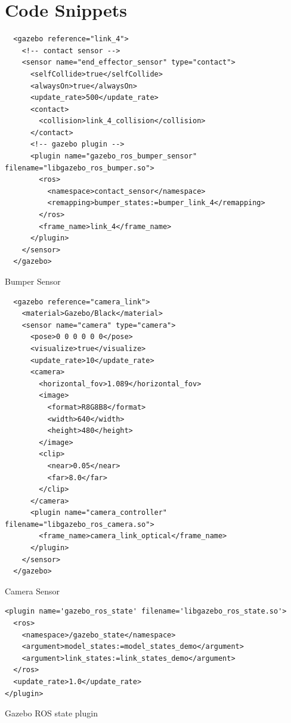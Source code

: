 \documentclass[12pt,oneside]{article}
\begin{document}
\section{Code Snippets}
\begin{listing}[htbp]
\begin{verbatim} 
  <gazebo reference="link_4">
    <!-- contact sensor -->
    <sensor name="end_effector_sensor" type="contact">
      <selfCollide>true</selfCollide>
      <alwaysOn>true</alwaysOn>
      <update_rate>500</update_rate>
      <contact>
        <collision>link_4_collision</collision>
      </contact>
      <!-- gazebo plugin -->
      <plugin name="gazebo_ros_bumper_sensor" filename="libgazebo_ros_bumper.so">
        <ros>
          <namespace>contact_sensor</namespace>
          <remapping>bumper_states:=bumper_link_4</remapping>
        </ros>
        <frame_name>link_4</frame_name>
      </plugin>
    </sensor>
  </gazebo>
\end{verbatim}
\caption{Bumper Sensor}
\label{bumperSensorXml}
\end{listing}

\begin{listing}[htbp]
\begin{verbatim} 
  <gazebo reference="camera_link">
    <material>Gazebo/Black</material>
    <sensor name="camera" type="camera">
      <pose>0 0 0 0 0 0</pose>
      <visualize>true</visualize>
      <update_rate>10</update_rate>
      <camera>
        <horizontal_fov>1.089</horizontal_fov>
        <image>
          <format>R8G8B8</format>
          <width>640</width>
          <height>480</height>
        </image>
        <clip>
          <near>0.05</near>
          <far>8.0</far>
        </clip>
      </camera>
      <plugin name="camera_controller" filename="libgazebo_ros_camera.so">
        <frame_name>camera_link_optical</frame_name>
      </plugin>
    </sensor>
  </gazebo>
\end{verbatim}
\caption{Camera Sensor}
\label{cameraSensorXml}
\end{listing}

\begin{listing}[htbp]
\begin{verbatim} 
<plugin name='gazebo_ros_state' filename='libgazebo_ros_state.so'>
  <ros>
    <namespace>/gazebo_state</namespace>
    <argument>model_states:=model_states_demo</argument>
    <argument>link_states:=link_states_demo</argument>
  </ros>
  <update_rate>1.0</update_rate>
</plugin>
\end{verbatim}
\caption{Gazebo ROS state plugin}
\label{gazeboRosStatePluginXml}
\end{listing}
\end{document}
